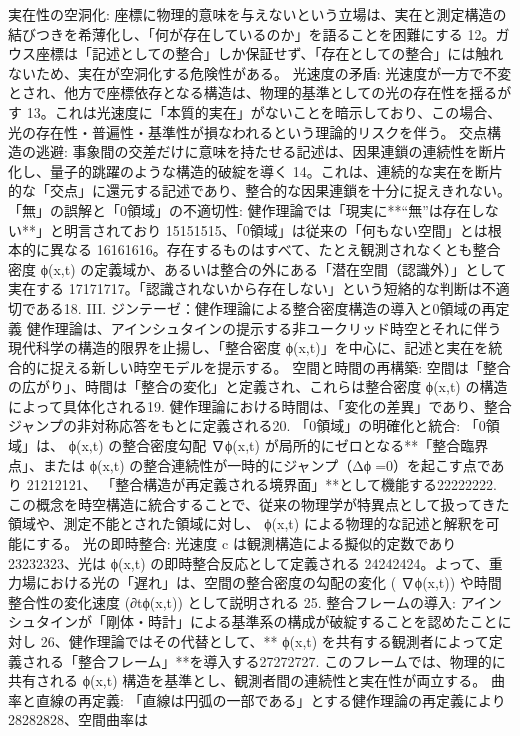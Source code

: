 \documentclass{article}
\begin{document}
実在性の空洞化: 座標に物理的意味を与えないという立場は、実在と測定構造の結びつきを希薄化し、「何が存在しているのか」を語ることを困難にする 12。ガウス座標は「記述としての整合」しか保証せず、「存在としての整合」には触れないため、実在が空洞化する危険性がある。
光速度の矛盾: 光速度が一方で不変とされ、他方で座標依存となる構造は、物理的基準としての光の存在性を揺るがす 13。これは光速度に「本質的実在」がないことを暗示しており、この場合、光の存在性・普遍性・基準性が損なわれるという理論的リスクを伴う。
交点構造の逃避: 事象間の交差だけに意味を持たせる記述は、因果連鎖の連続性を断片化し、量子的跳躍のような構造的破綻を導く 14。これは、連続的な実在を断片的な「交点」に還元する記述であり、整合的な因果連鎖を十分に捉えきれない。
「無」の誤解と「0領域」の不適切性: 健作理論では「現実に**“無”は存在しない**」と明言されており 15151515、「0領域」は従来の「何もない空間」とは根本的に異なる 16161616。存在するものはすべて、たとえ観測されなくとも整合密度 
ϕ(x,t) の定義域か、あるいは整合の外にある「潜在空間（認識外）」として実在する 17171717。「認識されないから存在しない」という短絡的な判断は不適切である18.
III. ジンテーゼ：健作理論による整合密度構造の導入と0領域の再定義
健作理論は、アインシュタインの提示する非ユークリッド時空とそれに伴う現代科学の構造的限界を止揚し、「整合密度 ϕ(x,t)」を中心に、記述と実在を統合的に捉える新しい時空モデルを提示する。
空間と時間の再構築:
空間は「整合の広がり」、時間は「整合の変化」と定義され、これらは整合密度 
ϕ(x,t) の構造によって具体化される19. 健作理論における時間は、「変化の差異」であり、整合ジャンプの非対称応答をもとに定義される20.
「0領域」の明確化と統合:
「0領域」は、
ϕ(x,t) の整合密度勾配 ∇ϕ(x,t) が局所的にゼロとなる**「整合臨界点」、または ϕ(x,t) の整合連続性が一時的にジャンプ（Δϕ=0）を起こす点であり 21212121、
「整合構造が再定義される境界面」**として機能する22222222. この概念を時空構造に統合することで、従来の物理学が特異点として扱ってきた領域や、測定不能とされた領域に対し、
ϕ(x,t) による物理的な記述と解釈を可能にする。
光の即時整合:
光速度 
c は観測構造による擬似的定数であり 23232323、光は 
ϕ(x,t) の即時整合反応として定義される 24242424。よって、重力場における光の「遅れ」は、空間の整合密度の勾配の変化 (
∇ϕ(x,t)) や時間整合性の変化速度 (∂t​ϕ(x,t)) として説明される 25.
整合フレームの導入:
アインシュタインが「剛体・時計」による基準系の構成が破綻することを認めたことに対し 26、健作理論ではその代替として、**
ϕ(x,t) を共有する観測者によって定義される「整合フレーム」**を導入する27272727. このフレームでは、物理的に共有される 
ϕ(x,t) 構造を基準とし、観測者間の連続性と実在性が両立する。
曲率と直線の再定義:
「直線は円弧の一部である」とする健作理論の再定義により 28282828、空間曲率は 
\end{document}
